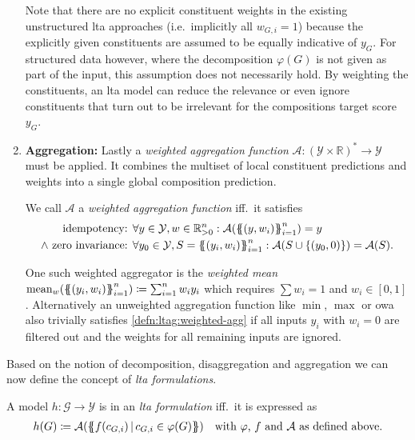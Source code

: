 \begin{enumerate}[label=\textbf{\arabic*.}]
		Note that there are no explicit constituent weights in the existing unstructured \ac{lta} approaches (i.e.\ implicitly all $w_{G, i} = 1$) because the explicitly given constituents are assumed to be equally indicative of $y_G$.
		For structured data however, where the decomposition $\varphi(G)$ is not given as part of the input, this assumption does not necessarily hold.
		By weighting the constituents, an \ac{lta} model can reduce the relevance or even ignore constituents that turn out to be irrelevant for the compositions target score $y_G$.
	\item \textbf{Aggregation:}
		Lastly a \textit{weighted aggregation function} $\mathcal{A}: {(\mathcal{Y} \times \mathbb{R})}^{*} \to \mathcal{Y}$ must be applied.
		It combines the multiset of local constituent predictions and weights into a single global composition prediction.
		\begin{defn}\label{defn:ltag:weighted-agg}
			We call $\mathcal{A}$ a \textit{weighted aggregation function} iff.\ it satisfies
			\begin{align*}
				\text{idempotency: } & \forall y \in \mathcal{Y}, w \in \mathbb{R}_{> 0}^n: \mathcal{A}({\ldblbrace (y, w_i) \rdblbrace}_{i=1}^n) = y \\
				\land\text{ zero invariance: } & \forall y_0 \in \mathcal{Y}, S = {\ldblbrace (y_i, w_i) \rdblbrace}_{i=1}^n: \mathcal{A}(S \cup \{ (y_0, 0) \}) = \mathcal{A}(S) \text{.}
			\end{align*}
		\end{defn}
		One such weighted aggregator is the \textit{weighted mean} $\mean_w({\ldblbrace (y_i, w_i) \rdblbrace}_{i=1}^n) \coloneqq \sum_{i=1}^n w_i y_i$ which requires $\sum w_i = 1$ and $w_i \in [0, 1]$.
		Alternatively an unweighted aggregation function like $\min$, $\max$ or \ac{owa} also trivially satisfies \cref{defn:ltag:weighted-agg} if all inputs $y_i$ with $w_i = 0$ are filtered out and the weights for all remaining inputs are ignored.
\end{enumerate}
Based on the notion of decomposition, disaggregation and aggregation we can now define the concept of \textit{\ac{lta} formulations}.
\begin{defn}
	A model $h: \mathcal{G} \to \mathcal{Y}$ is in an \textit{\ac{lta} formulation} iff.\ it is expressed as
	\begin{align*}
		h(G) \coloneqq \mathcal{A}(\ldblbrace f(c_{G,i})\, |\, c_{G,i} \in \varphi(G) \rdblbrace) \quad\text{with $\varphi$, $f$ and $\mathcal{A}$ as defined above.}
	\end{align*}
\end{defn}
